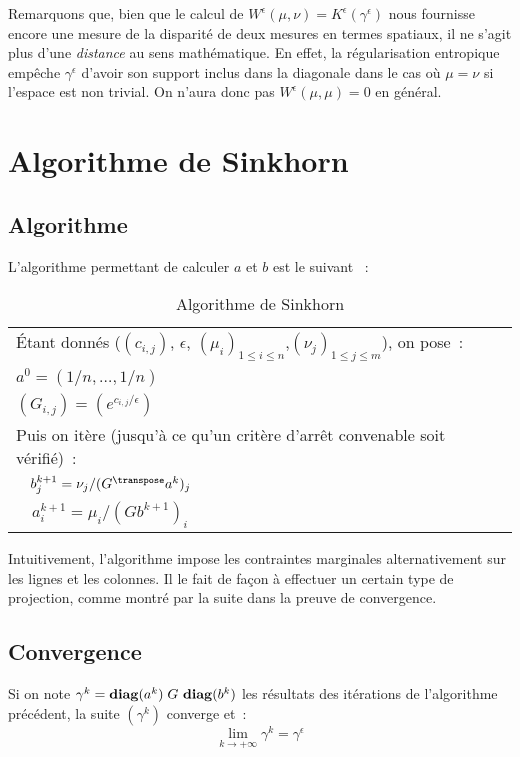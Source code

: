 Remarquons que, bien que le calcul de $W^\epsilon(\mu,\nu) = K^\epsilon(\gamma^\epsilon)$ nous fournisse encore une mesure de la disparité de deux mesures en termes spatiaux, il ne s'agit plus d'une \emph{distance} au sens mathématique. En effet, la régularisation entropique empêche $\gamma^\epsilon$ d'avoir son support inclus dans la diagonale dans le cas où $\mu = \nu$ si l'espace est non trivial. On n'aura donc pas $W^\epsilon (\mu,\mu) = 0$ en général.

\section{Algorithme de Sinkhorn}

\subsection{Algorithme}
L'algorithme permettant de calculer $a$ et $b$ est le suivant \cite{cuturi13}~:

\begin{table}[h!]
\centering
\caption*{Algorithme de Sinkhorn}
\label{algorithme}
\begin{tabular}{|l|}
\hline
\'Etant donnés ($(c_{i,j})$, $\epsilon$, $(\mu_i)_{1\le i \le n}$,$(\nu_j)_{1 \le j \le m}$), on pose~: \\
$a^0 = (1/n, \ldots, 1/n)$\\
$(G_{i,j}) = (e^{c_{i,j}/\epsilon})$\\
Puis on itère (jusqu'à ce qu'un critère d'arrêt convenable soit vérifié)~: \\
$\quad b^{k+1}_j = \nu_j / (G^\transpose a^k)_j$\\
$\quad a^{k+1}_i = \mu_i /(G b^{k+1})_i$ \\
\hline
\end{tabular}
\end{table}
Intuitivement, l'algorithme impose les contraintes marginales alternativement sur les lignes et les colonnes. Il le fait de façon à effectuer un certain type de projection, comme montré par la suite dans la preuve de convergence.

\subsection{Convergence}
\begin{theoreme}
\label{th:sink_cv}
Si on note $\gamma^k = \operatorname{\mathbf{diag}}(a^k)\;G\,\operatorname{\mathbf{diag}}(b^k)$ les résultats des itérations de l'algorithme précédent, la suite $(\gamma^k)$ converge et~:
\[\lim_{k \rightarrow +\infty} \gamma^k = \gamma^\epsilon\]
\end{theoreme}

